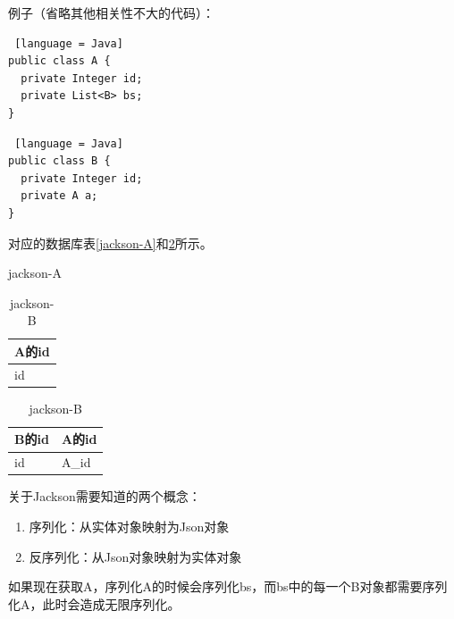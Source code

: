 例子（省略其他相关性不大的代码）：

\begin{lstlisting} [language = Java]
public class A {
  private Integer id;
  private List<B> bs;
}
\end{lstlisting}

\begin{lstlisting} [language = Java]
public class B {
  private Integer id;
  private A a;
}
\end{lstlisting}

对应的数据库表\ref{jackson-A}和\ref{jackson-B}所示。

\begin{table}[htbp]
  \begin{minipage}{0.45\linewidth}
    \centering
    \song\wuhao
    \caption{jackson-A}
    \label{jackson-A}
    \begin{tabular}{l}
      \hline
      A的id \\ \hline
      id    \\ \hline
    \end{tabular}
  \end{minipage}
  \begin{minipage}{0.45\linewidth}
    \centering
    \song\wuhao
    \caption{jackson-B}
    \label{jackson-B}
    \begin{tabular}{ll}
      \hline
      B的id & A的id \\ \hline
      id    & A\_id \\ \hline
    \end{tabular}
  \end{minipage}
\end{table}

关于Jackson需要知道的两个概念：
\begin{enumerate}
  \item 序列化：从实体对象映射为Json对象
  \item 反序列化：从Json对象映射为实体对象
\end{enumerate}

如果现在获取A，序列化A的时候会序列化bs，而bs中的每一个B对象都需要序列化A，此时会造成无限序列化。

